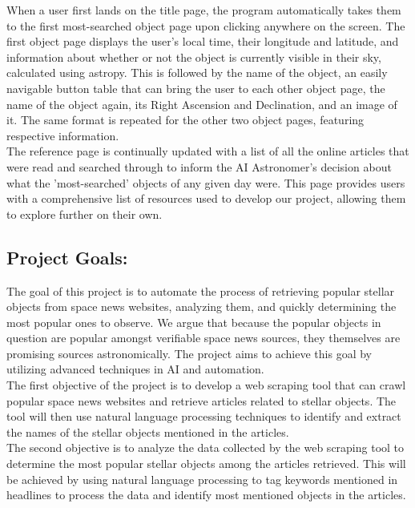 \documentclass[12pt,letterpaper]{article}
\begin{document}
\quad When a user first lands on the title page, the program automatically takes them to 
the first most-searched object page upon clicking anywhere on the screen. The first object 
page displays the user's local time, their longitude and latitude, and information about 
whether or not the object is currently visible in their sky, calculated using astropy. This 
is followed by the name of the object, an easily navigable button table that can bring the 
user to each other object page, the name of the object again, its Right Ascension and Declination, 
and an image of it. The same format is repeated for the other two object pages, featuring 
respective information. \\

\quad The reference page is continually updated with a list of all the online articles that 
were read and searched through to inform the AI Astronomer's decision about what the 'most-searched' 
objects of any given day were. This page provides users with a comprehensive list of resources 
used to develop our project, allowing them to explore further on their own. \\


\subsection*{Project Goals:}
\quad The goal of this project is to automate the process of retrieving popular stellar objects 
from space news websites, analyzing them, and quickly determining the most popular ones to 
observe. We argue that because the popular objects in question are popular amongst
verifiable space news sources, they themselves are promising sources astronomically. 
The project aims to achieve this goal by utilizing advanced techniques in AI and 
automation.\\

\quad The first objective of the project is to develop a web scraping tool that can 
crawl popular space news websites and retrieve articles related to stellar objects. 
The tool will then use natural language processing techniques to identify and extract 
the names of the stellar objects mentioned in the articles.\\

\quad The second objective is to analyze the data collected by the web scraping tool 
to determine the most popular stellar objects among the articles retrieved. This 
will be achieved by using natural language processing to tag keywords mentioned 
in headlines to process the data and identify most mentioned objects in the articles.\\
\end{document}
